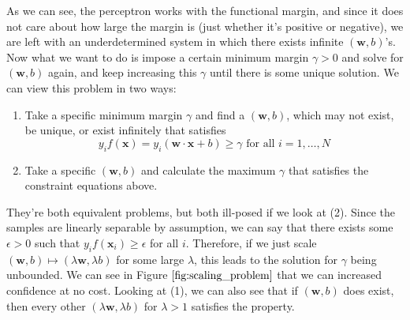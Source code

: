   As we can see, the perceptron works with the functional margin, and since it does not care about how large the margin is (just whether it's positive or negative), we are left with an underdetermined system in which there exists infinite $(\mathbf{w}, b)$'s. Now what we want to do is impose a certain minimum margin $\gamma > 0$ and solve for $(\mathbf{w}, b)$ again, and keep increasing this $\gamma$ until there is some unique solution. We can view this problem in two ways: 
  \begin{enumerate} 
      \item Take a specific minimum margin $\gamma$ and find a $(\mathbf{w}, b)$, which may not exist, be unique, or exist infinitely that satisfies 
          \begin{equation*}
              y_i f(\mathbf{x}) = y_i ( \mathbf{w} \cdot \mathbf{x} + b) \geq \gamma \text{ for all } i = 1, \ldots, N 
          \end{equation*}
      \item Take a specific $(\mathbf{w}, b)$ and calculate the maximum $\gamma$ that satisfies the constraint equations above.  
  \end{enumerate}

  They're both equivalent problems, but both ill-posed if we look at (2). Since the samples are linearly separable by assumption, we can say that there exists some $\epsilon > 0$ such that $y_i f(\mathbf{x}_i) \geq \epsilon$ for all $i$. Therefore, if we just scale $(\mathbf{w}, b) \mapsto (\lambda \mathbf{w}, \lambda b)$ for some large $\lambda$, this leads to the solution for $\gamma$ being unbounded. We can see in Figure $\ref{fig:scaling_problem}$ that we can increased confidence at no cost. Looking at (1), we can also see that if $(\mathbf{w}, b)$ does exist, then every other $(\lambda \mathbf{w}, \lambda b)$ for $\lambda > 1$ satisfies the property.   

